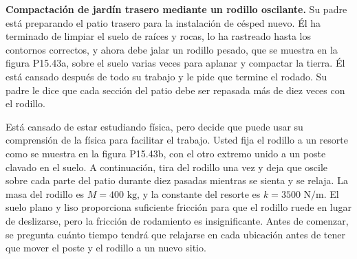 \item \textbf{Compactación de jardín trasero mediante un rodillo oscilante.}
Su padre está preparando el patio trasero para la instalación de césped nuevo. Él ha terminado de limpiar el suelo de raíces y rocas, lo ha rastreado hasta los contornos correctos, y ahora debe jalar un rodillo pesado, que se muestra en la figura P15.43a, sobre el suelo varias veces para aplanar y compactar la tierra. Él está cansado después de todo su trabajo y le pide que termine el rodado. Su padre le dice que cada sección del patio debe ser repasada más de diez veces con el rodillo.

Está cansado de estar estudiando física, pero decide que puede usar su comprensión de la física para facilitar el trabajo. Usted fija el rodillo a un resorte como se muestra en la figura P15.43b, con el otro extremo unido a un poste clavado en el suelo. A continuación, tira del rodillo una vez y deja que oscile sobre cada parte del patio durante diez pasadas mientras se sienta y se relaja. La masa del rodillo es $M = 400\text{ kg}$, y la constante del resorte es $k = 3500\text{ N/m}$. El suelo plano y liso proporciona suficiente fricción para que el rodillo ruede en lugar de deslizarse, pero la fricción de rodamiento es insignificante.
Antes de comenzar, se pregunta cuánto tiempo tendrá que relajarse en cada ubicación antes de tener que mover el poste y el rodillo a un nuevo sitio.